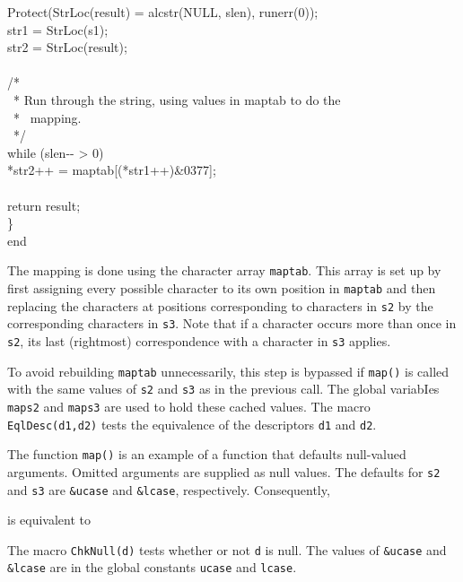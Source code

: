 {\>\>\>Protect(StrLoc(result) = alcstr(NULL, slen), runerr(0));\\
\>\>\>str1 = StrLoc(s1);\\
\>\>\>str2 = StrLoc(result);\\
\\
\>\>\>/*\\
\>\>\>\ * Run through the string, using values in maptab to do the\\
\>\>\>\ * \ mapping.\\
\>\>\>\ */\\
\>\>\>while (slen-{}- > 0)\\
\>\>\>\>*str2++ = maptab[(*str1++)\&0377];\\
\\
\>\>\>return result;\\
\>\>\}\\
end\\
}

The mapping is done using the character array \texttt{maptab}. This
array is set up by first assigning every possible character to its own
position in \texttt{maptab} and then replacing the characters at
positions corresponding to characters in \texttt{s2} by the
corresponding characters in \texttt{s3}. Note that if a character
occurs more than once in \texttt{s2}, its last (rightmost)
correspondence with a character in \texttt{s3} applies.

To avoid rebuilding \texttt{maptab} unnecessarily, this step is
bypassed if \texttt{map()} is called with the same values of
\texttt{s2} and \texttt{s3} as in the previous call. The global
variabIes \texttt{maps2} and \texttt{maps3} are used to hold these
{\textquotedbl}cached{\textquotedbl} values. The macro
\texttt{EqlDesc(d1,d2)} tests the equivalence of the descriptors
\texttt{d1} and \texttt{d2}.

The function \texttt{map()} is an example of a function that defaults
null-valued arguments. Omitted arguments are supplied as null
values. The defaults for \texttt{s2} and \texttt{s3} are
\texttt{\&ucase} and \texttt{\&lcase}, respectively. Consequently,


\noindent
is equivalent to


The macro \texttt{ChkNull(d)} tests whether or not \texttt{d} is
null. The values of \texttt{\&ucase} and \texttt{\&lcase} are in the
global constants \texttt{ucase} and \texttt{lcase}.

